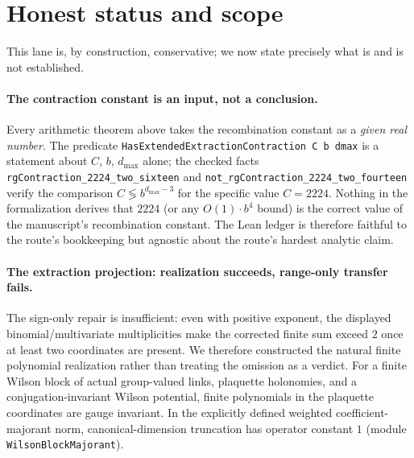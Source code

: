 \documentclass[11pt]{article}
\theoremstyle{definition}
\newcommand{\dmax}{d_{\max}}
\begin{document}
\section{Honest status and scope}\label{sec:honest}

This lane is, by construction, conservative; we now state precisely what is and
is not established.

\paragraph{The contraction constant is an input, not a conclusion.}
Every arithmetic theorem above takes the recombination constant as a
\emph{given real number}. The predicate \texttt{HasExtendedExtractionContraction
C b dmax} is a statement about $C$, $b$, $\dmax$ alone; the checked facts
\texttt{rgContraction\_2224\_two\_sixteen} and
\texttt{not\_rgContraction\_2224\_two\_fourteen} verify the comparison
$C \lessgtr b^{\dmax-3}$ for the specific value $C=2224$. Nothing in the
formalization derives that $2224$ (or any $O(1)\cdot b^4$ bound) is the correct
value of the manuscript's recombination constant. The Lean ledger is therefore
faithful to the route's bookkeeping but agnostic about the route's hardest
analytic claim.

\paragraph{The extraction projection: realization succeeds, range-only transfer
fails.}
The sign-only repair is insufficient: even with positive exponent, the displayed
binomial/multivariate multiplicities make the corrected finite sum exceed $2$
once at least two coordinates are present. We therefore constructed the natural
finite polynomial realization rather than treating the omission as a verdict.
For a finite Wilson block of actual group-valued links, plaquette holonomies,
and a conjugation-invariant Wilson potential, finite polynomials in the
plaquette coordinates are gauge invariant. In the explicitly defined weighted
coefficient-majorant norm, canonical-dimension truncation has operator constant
$1$ (module \texttt{WilsonBlockMajorant}).
\end{document}
